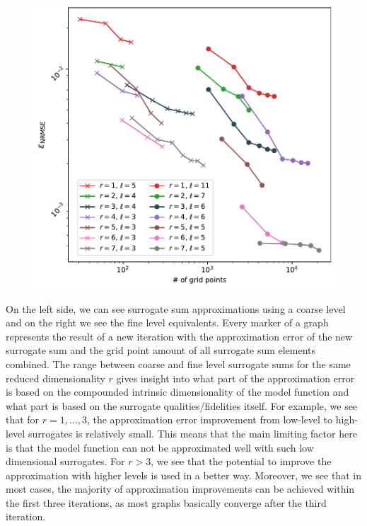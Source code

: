 \documentclass[
  a4paper,  %
  twoside,  %
  bibliography=totoc,
  headsepline,
  cleardoublepage=empty,
  parskip=half,
  draft=false
]{scrbook}
\begin{document}
\begin{mdframed}[style=style]
\begin{figure}[H]
\includegraphics[width=\textwidth]{graphics/wingweight_fixed}
\delimit
{}
\label{fig:wwf}
\end{figure}
\end{mdframed}
%
On the left side, we can see surrogate sum approximations using a coarse level and on the right we see the fine level equivalents.
Every marker of a graph represents the result of a new iteration with the approximation error of the new surrogate sum and the grid point amount of all surrogate sum elements combined.
The range between coarse and fine level surrogate sums for the same reduced dimensionality $r$ gives insight into what part of the approximation error is based on the compounded intrinsic dimensionality of the model function and what part is based on the surrogate qualities/fidelities itself.
For example, we see that for $r=1, \dots, 3$, the approximation error improvement from low-level to high-level surrogates is relatively small.
This means that the main limiting factor here is that the model function can not be approximated well with such low dimensional surrogates.
For $r > 3$, we see that the potential to improve the approximation with higher levels is used in a better way.
Moreover, we see that in most cases, the majority of approximation improvements can be achieved within the first three iterations, as most graphs basically converge after the third iteration.
\end{document}
